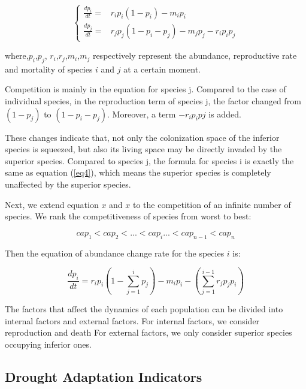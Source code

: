 \documentclass{mcmthesis}
\begin{document}
\begin{equation}
	\label{eq6}
	\left\{
	\begin{aligned}
		\frac{dp_i}{dt} = & r_ip_i(1-p_i) -m_ip_i\\
		\frac{dp_j}{dt} = & r_jp_j(1-p_i-p_j) - m_jp_j-r_ip_ip_j
	\end{aligned}
	\right.
\end{equation}

where,$p_i$,$p_j$, $r_i$,$r_j$,$m_i$,$m_j$ respectively represent the abundance, reproductive rate and mortality of species $i$ and $j$ at a certain moment.

Competition is mainly in the equation for species j. Compared to the case of individual species, in the reproduction term of species j, the factor  changed from $(1-p_j)$ to $(1-p_i-p_j)$. Moreover, a term $-r_ip_ipj$ is added. 

These changes indicate that, not only the colonization space of the inferior species is squeezed, but also its living space may be directly invaded by the superior species. Compared to species j, the formula for species i is exactly the same as equation (\ref{eq4}), which means the superior species is completely unaffected by the superior species.

Next, we extend equation $x$ and $x$ to the competition of an infinite number of species. We rank the competitiveness of species from worst to best:



\begin{equation}
	\label{eq7}
cap_1<cap_2<...<cap_i...<cap_{n-1}<cap_n
\end{equation}

Then the equation of abundance change rate for the species $i$ is:

\begin{equation}
	\label{eq8}
	\frac{dp_i}{dt}=r_ip_i(1-\sum_{j=1}^{i}{p_j})-m_ip_i-
	(\sum_{j=1}^{i-1}{r_jp_jp_i})
\end{equation}

The factors that affect the dynamics of each population can be divided into internal factors and external factors. For internal factors, we consider reproduction and death For external factors, we only consider superior species occupying inferior ones.

\subsection{Drought Adaptation Indicators}
\end{document}
